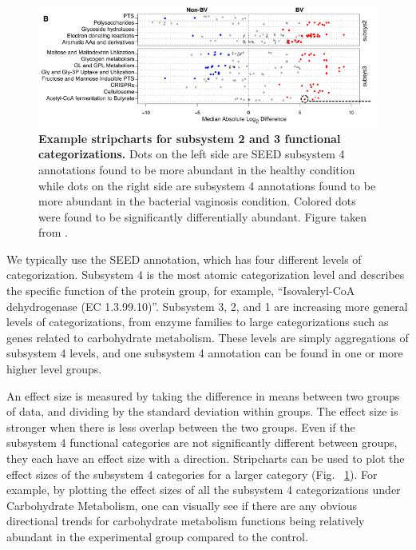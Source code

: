 \begin{figure}[h]
\begin{center}
\includegraphics[width=\textwidth]{stripchart.png}
\caption[Example stripcharts for subsystem 2 and 3 functional categorizations.]{\textbf{Example stripcharts for subsystem 2 and 3 functional categorizations.} Dots on the left side are SEED subsystem 4 annotations found to be more abundant in the healthy condition while dots on the right side are subsystem 4 annotations found to be more abundant in the bacterial vaginosis condition. Colored dots were found to be significantly differentially abundant. Figure taken from \cite{macklaim2013comparative}.}
\label{stripchart_example}
\end{center}
\end{figure}

We typically use the SEED annotation, which has four different levels of categorization. Subsystem 4 is the most atomic categorization level and describes the specific function of the protein group, for example, “Isovaleryl-CoA dehydrogenase (EC 1.3.99.10)”. Subsystem 3, 2, and 1 are increasing more general levels of categorizations, from enzyme families to large categorizations such as genes related to carbohydrate metabolism. These levels are simply aggregations of subsystem 4 levels, and one subsystem 4 annotation can be found in one or more higher level groups.

An effect size is measured by taking the difference in means between two groups of data, and dividing by the standard deviation within groups. The effect size is stronger when there is less overlap between the two groups. Even if the subsystem 4 functional categories are not significantly different between groups, they each have an effect size with a direction. Stripcharts can be used to plot the effect sizes of the subsystem 4 categories for a larger category (Fig. ~\ref{stripchart_example}). For example, by plotting the effect sizes of all the subsystem 4 categorizations under Carbohydrate Metabolism, one can visually see if there are any obvious directional trends for carbohydrate metabolism functions being relatively abundant in the experimental group compared to the control.

